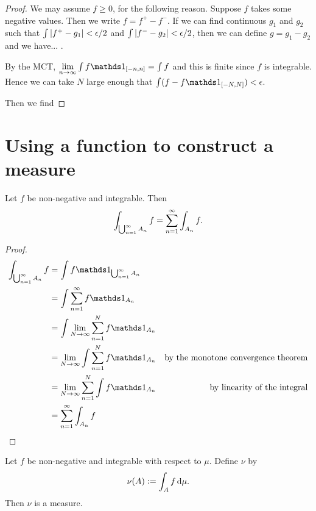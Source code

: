 \begin{proof}
  We may assume $f \geq 0$, for the following reason. Suppose $f$ takes some negative values. Then we
  write $f = f^+ - f^-$. If we can find continuous $g_1$ and $g_2$ such that $\int |f^+ - g_1| < \epsilon/2$
  and $\int |f^- - g_2| < \epsilon/2$, then we can define $g = g_1 - g_2$ and we have... .

  By the MCT, $\limninf \int f\ind_{[-n, n]} = \int f$ and this is finite since $f$ is integrable. Hence we can
  take $N$ large enough that $\int (f - f\ind_{[-N, N]}) < \eps$.

  Then we find

\end{proof}




\section{Using a function to construct a measure }


\begin{lemma}\label{lemma-integral-over-countable-disjoint-sets}
  Let $f$ be non-negative and integrable. Then
  \begin{align*}
    \int_{\bigcup_{n=1}^{\infty} A_n} f  = \sum_{n=1}^{\infty} \int_{A_n} f.
  \end{align*}
\end{lemma}

\begin{proof}
  \begin{align*}
    \int_{\cupninf A_n} f
    &= \int f \ind_{\cupninf A_n}  \\
    &= \int \sumninf f \ind_{A_n}  \\
    &= \int \lim_{N \to \infty} \sum_{n=1}^N f \ind_{A_n}  \\
    &= \lim_{N \to \infty} \int \sum_{n=1}^N f \ind_{A_n}  & \text{by the monotone convergence theorem}\\
    &= \lim_{N \to \infty} \sum_{n=1}^N \int f \ind_{A_n}  & \text{by linearity of the integral}\\
    &= \sum_{n=1}^\infty \int_{A_n} f  \\
  \end{align*}
\end{proof}

\begin{theorem}
  Let $f$ be non-negative and integrable with respect to $\mu$. Define $\nu$ by
  \begin{align*}
  \nu(A) := \int_A f \d\mu.
  \end{align*}
  Then $\nu$ is a measure.
\end{theorem}

